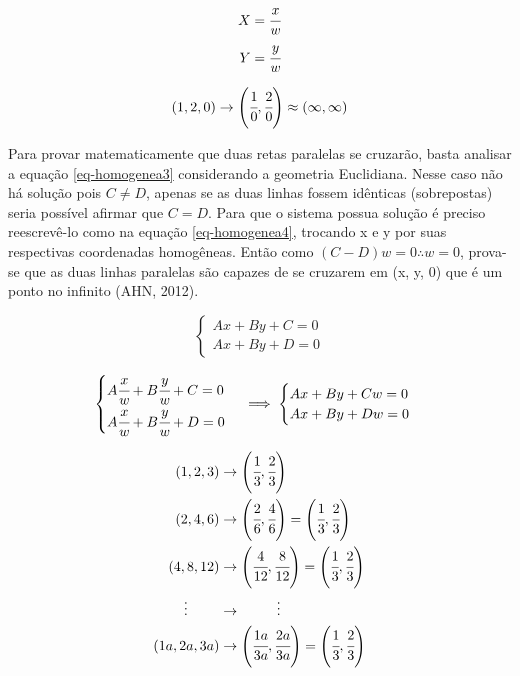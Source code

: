 \begin{equation} \label{eq-homogenea}
	\begin{aligned}
	X = \cfrac{x}{w} \\
	Y = \cfrac{y}{w} 
	\end{aligned}
\end{equation}

\begin{equation} \label{eq-homogenea2}
	\begin{aligned}
		(1,2,0) \rightarrow \left(\cfrac{1}{0}, \cfrac{2}{0}\right) \approx (\infty,\infty)
	\end{aligned}
\end{equation}

Para provar matematicamente que duas retas paralelas se cruzarão, basta analisar a equação \ref{eq-homogenea3} considerando a geometria Euclidiana. Nesse caso não há solução pois $ C \neq D $, apenas se as duas linhas fossem idênticas (sobrepostas) seria possível afirmar que $ C = D $. Para que o sistema possua solução é preciso reescrevê-lo como na equação \ref{eq-homogenea4}, trocando x e y por suas respectivas coordenadas homogêneas. Então como $ (C-D)w = 0 \therefore w=0 $, prova-se que as duas linhas paralelas são capazes de se cruzarem em (x, y, 0) que é um ponto no infinito (AHN, 2012).

\begin{equation} \label{eq-homogenea3}
	\begin{cases}
	Ax + By + C = 0 \\
	Ax + By + D = 0
	\end{cases}
\end{equation}

\begin{equation} \label{eq-homogenea4}
	\begin{cases}
	A\cfrac{x}{w} + B\cfrac{y}{w} + C = 0 \\
	A\cfrac{x}{w} + B\cfrac{y}{w} + D = 0
	\end{cases}
	\implies
	\begin{cases}
		Ax + By + Cw = 0 \\
		Ax + By + Dw = 0
	\end{cases}
\end{equation}

\begin{equation} \label{eq-homogenea5}
	\begin{split}
	(1,2,3) & \rightarrow \left(\cfrac{1}{3},\cfrac{2}{3}\right) \\
	(2,4,6) & \rightarrow \left(\cfrac{2}{6},\cfrac{4}{6}\right) = \left(\cfrac{1}{3},\cfrac{2}{3}\right) \\
	(4,8,12) & \rightarrow \left(\cfrac{4}{12},\cfrac{8}{12}\right) = \left(\cfrac{1}{3},\cfrac{2}{3}\right) \\
	\vdots \hspace{.8cm} & \rightarrow \hspace{.9cm} \vdots \\
	(1a,2a,3a) & \rightarrow \left(\cfrac{1a}{3a},\cfrac{2a}{3a}\right) = \left(\cfrac{1}{3},\cfrac{2}{3}\right)
	\end{split}
\end{equation}
